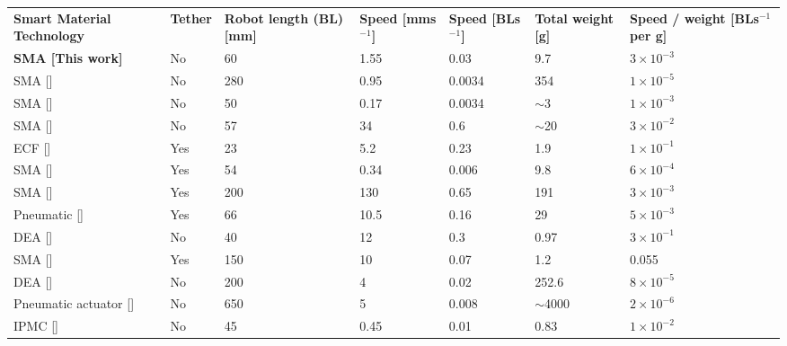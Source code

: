 \documentclass[border=1mm,
               class=article
               preview]{standalone}
\begin{document}
 {
\begin{tabular}{p{3.25cm}P{1cm}P{1.5cm}P{1.25cm}P{1.25cm}P{2cm}P{1.25cm}}
    \textbf{\color{white} Smart Material Technology} & \textbf{\color{white} Tether} & \textbf{\color{white} Robot length (BL) [mm]} & \textbf{\color{white} Speed [mms$^{-1}$]} & \textbf{\color{white} Speed [BLs$^{-1}$]} & \textbf{\color{white} Total weight [g]}  & \textbf{\color{white} Speed / weight [BLs$^{-1}$ per g]}\\
   \textbf{SMA [This work]} & No & 60 & 1.55 & 0.03 & 9.7 & $3\times10^{-3}$                          \\
   SMA [\cite{meng_mechanically_2020}] & No & 280 & 0.95 & 0.0034 & 354 & $1\times10^{-5}$\\
   SMA [\cite{kimEarthwormlikeMicroRobot2006}]& No & 50 & 0.17 & 0.0034 & $\sim$3 & $1\times10^{-3}$\\
   SMA [\cite{huangChasingBiomimeticLocomotion2018}] & No & 57 & 34 & 0.6 & $\sim$20 & $3\times10^{-2}$\\
   ECF [\cite{uenoMicroInchwormRobot2014}] & Yes & 23 & 5.2 & 0.23 & 1.9 & $1\times10^{-1}$\\
   SMA [\cite{liangShapeMemoryAlloy2020}] & Yes & 54 & 0.34 & 0.006 & 9.8 & $6\times10^{-4}$\\
   SMA [\cite{mansourCompliantClosedchainRolling2020}] & Yes & 200 & 130 & 0.65 & 191 & $3\times10^{-3}$\\
   Pneumatic [\cite{shengMultimaterial3DPrinting2020}] & Yes & 66 & 10.5 & 0.16 & 29 & $5\times10^{-3}$\\
   DEA [\cite{jiAutonomousUntetheredFast2019}] & No & 40 & 12  & 0.3 & 0.97 & $3\times10^{-1}$\\
   SMA [\cite{kohOmegaShapedInchwormInspiredCrawling2013}] & Yes & 150 & 10 & 0.07 & 1.2 & 0.055\\
   DEA [\cite{caoUntetheredSoftRobot2018}] & No & 200 & 4 & 0.02 & 252.6 & $8\times10^{-5}$\\
   Pneumatic actuator [\cite{tolleyResilientUntetheredSoft2014}] & No & 650 & 5 & 0.008 & $\sim$4000 & $2\times10^{-6}$\\
   IPMC [\cite{mustIonicCapacitiveArtificial2015}] & No & 45 & 0.45 & 0.01 & 0.83 & $1\times10^{-2}$\\
\end{tabular}}
\end{document}
